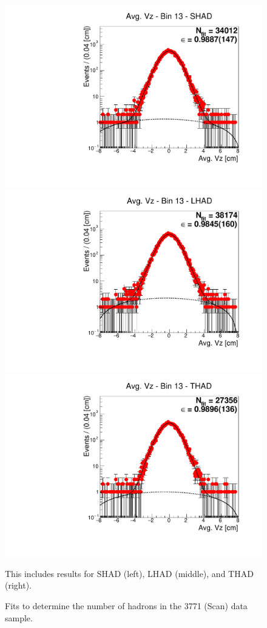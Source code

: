 \begin{figure}[H]
\centering
\includegraphics[scale=0.25]{figures/plots/nonDDbar_fit_results/scan/fit_scan_13_data_SHAD.pdf}
\hspace{-0.5cm}
\includegraphics[scale=0.25]{figures/plots/nonDDbar_fit_results/scan/fit_scan_13_data_LHAD.pdf}
\hspace{-0.5cm}
\includegraphics[scale=0.25]{figures/plots/nonDDbar_fit_results/scan/fit_scan_13_data_THAD.pdf}
\caption{Fits to determine the number of hadrons in the 3771 (Scan) data sample.}
{This includes results for SHAD (left), LHAD (middle), and THAD (right).}
\label{fig:hadron_fits_scan_13}
\end{figure}

